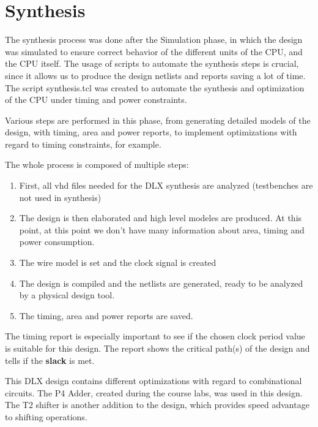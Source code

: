 \chapter{Synthesis}
\label{Synthesis}

The synthesis process was done after the Simulation phase, in which the design was simulated to ensure correct behavior of the different units of the CPU, and the CPU itself.
The usage of scripts to automate the synthesis steps is crucial, since it allows us to produce the design netlists and reports saving a lot of time.
The script synthesis.tcl was created to automate the synthesis and optimization of the CPU under timing and power constraints.

Various steps are performed in this phase, from generating detailed models of the design, with timing, area and power reports, to implement optimizations
with regard to timing constraints, for example.

The whole process is composed of multiple steps:

\begin{enumerate}
    \item First, all vhd files needed for the DLX synthesis are analyzed (testbenches are not used in synthesis)
    \item The design is then elaborated and high level modeles are produced. At this point, at this point we don't have many information about area, timing and power consumption.
    \item The wire model is set and the clock signal is created
    \item The design is compiled and the netlists are generated, ready to be analyzed by a physical design tool.
    \item The timing, area and power reports are saved.
\end{enumerate}

The timing report is especially important to see if the chosen clock period value is suitable for this design.
The report shows the critical path(s) of the design and tells if the \textbf{slack} is met.

This DLX design contains different optimizations with regard to combinational circuits.
The P4 Adder, created during the course labs, was used in this design. The T2 shifter is another addition to the design, which provides speed advantage to shifting operations.

